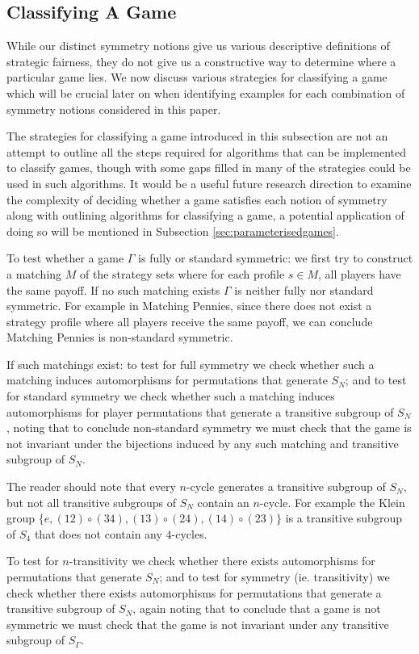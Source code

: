 \subsection{Classifying A Game} \label{subsec:classifying}
While our distinct symmetry notions give us various descriptive definitions of strategic fairness, they do not give us a constructive way to determine where a particular game lies. We now discuss various strategies for classifying a game which will be crucial later on when identifying examples for each combination of symmetry notions considered in this paper.

The strategies for classifying a game introduced in this subsection are not an attempt to outline all the steps required for algorithms that can be implemented to classify games, though with some gaps filled in many of the strategies could be used in such algorithms. It would be a useful future research direction to examine the complexity of deciding whether a game satisfies each notion of symmetry along with outlining algorithms for classifying a game, a potential application of doing so will be mentioned in Subsection \ref{sec:parameterisedgames}. 

To test whether a game $\Gamma$ is fully or standard symmetric: we first try to construct a matching $M$ of the strategy sets where for each profile $s \in M$, all players have the same payoff. If no such matching exists $\Gamma$ is neither fully nor standard symmetric. For example in Matching Pennies, since there does not exist a strategy profile where all players receive the same payoff, we can conclude Matching Pennies is non-standard symmetric.

If such matchings exist: to test for full symmetry we check whether such a matching induces automorphisms for permutations that generate $S_N$; and to test for standard symmetry we check whether such a matching induces automorphisms for player permutations that generate a transitive subgroup of $S_N$, noting that to conclude non-standard symmetry we must check that the game is not invariant under the bijections induced by any such matching and transitive subgroup of $S_N$. 

The reader should note that every $n$-cycle generates a transitive subgroup of $S_N$, but not all transitive subgroups of $S_N$ contain an $n$-cycle. For example the Klein group $\{e, (12) \circ (34), (13) \circ (24), (14) \circ (23)\}$ is a transitive subgroup of $S_4$ that does not contain any $4$-cycles.

To test for $n$-transitivity we check whether there exists automorphisms for permutations that generate $S_N$; and to test for symmetry (ie. transitivity) we check whether there exists automorphisms for permutations that generate a transitive subgroup of $S_N$, again noting that to conclude that a game is not symmetric we must check that the game is not invariant under any transitive subgroup of $S_{\Gamma}$. 

